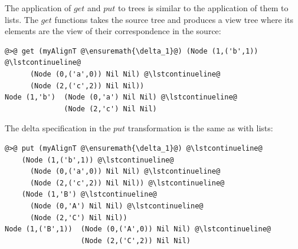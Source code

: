 \documentclass[numbers]{sigplanconf}
\newcommand{\Varid}[1]{\mathit{#1}}
\begin{document}
The application of \ensuremath{\Varid{get}} and \ensuremath{\Varid{put}} to trees is similar to the application of
them to lists. The \ensuremath{\Varid{get}} functions takes the source tree and produces a view
tree where its elements are the view of their correspondence in the source:
%
\begin{lstlisting}
@>@ get (myAlignT @\ensuremath{\delta_1}@) (Node (1,('b',1)) @\lstcontinueline@
      (Node (0,('a',0)) Nil Nil) @\lstcontinueline@
      (Node (2,('c',2)) Nil Nil))
Node (1,'b')  (Node (0,'a') Nil Nil) @\lstcontinueline@
              (Node (2,'c') Nil Nil)
\end{lstlisting}
%
The delta specification in the \ensuremath{\Varid{put}} transformation is the same as with lists:
%
\begin{lstlisting}
@>@ put (myAlignT @\ensuremath{\delta_1}@) @\lstcontinueline@
    (Node (1,('b',1)) @\lstcontinueline@
      (Node (0,('a',0)) Nil Nil) @\lstcontinueline@
      (Node (2,('c',2)) Nil Nil)) @\lstcontinueline@
    (Node (1,'B') @\lstcontinueline@
      (Node (0,'A') Nil Nil) @\lstcontinueline@
      (Node (2,'C') Nil Nil))
Node (1,('B',1))  (Node (0,('A',0)) Nil Nil) @\lstcontinueline@
                  (Node (2,('C',2)) Nil Nil)
\end{lstlisting}
\end{document}
